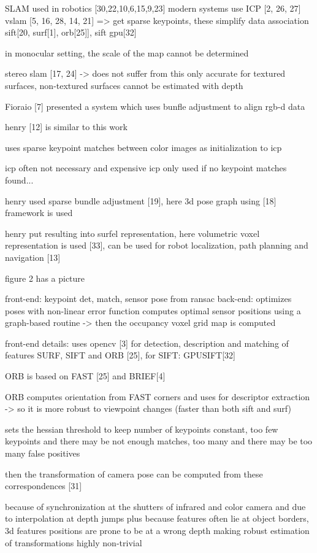 SLAM used in robotics [30,22,10,6,15,9,23]
modern systems use ICP [2, 26, 27]
vslam [5, 16, 28, 14, 21] => get sparse keypoints,  
these simplify data association
sift[20, surf[1], orb[25]], sift gpu[32]


in monocular setting, the scale of the map cannot be  determined

stereo slam [17, 24] -> does not suffer from this
only accurate for textured surfaces, non-textured surfaces cannot be estimated with depth

Fioraio [7] presented a system which uses bunfle adjustment to align rgb-d data

henry [12] is similar to this work

uses sparse keypoint matches between color images as initialization to icp

icp often not necessary and expensive
icp only used if no keypoint matches found...

henry used sparse bundle adjustment [19], here 3d pose graph using [18] framework is used

henry put resulting into surfel representation, here volumetric voxel representation is used [33], can be used for robot localization, path planning and navigation [13]

figure 2 has a picture

front-end: keypoint det, match, sensor pose from ransac
back-end: optimizes poses with non-linear error function
	computes optimal sensor positions using a graph-based routine -> then the occupancy voxel grid map is computed
	
front-end details: 
uses opencv [3] for detection, description and matching of features SURF, SIFT and ORB [25], for SIFT: GPUSIFT[32]

ORB is based on FAST [25] and BRIEF[4]

ORB computes orientation from FAST corners and uses for descriptor extraction -> so it is more robust to viewpoint changes (faster than both sift and surf)

sets the hessian threshold to keep number of keypoints constant, too few keypoints and there may be not enough matches, too many and there may be too many false positives

then the transformation of camera pose can be computed from these correspondences [31]


because of synchronization at the shutters of infrared and color camera and due to interpolation at depth jumps
plus because features often lie at object borders, 3d features positions are prone to be at a wrong depth making robust estimation of transformations highly non-trivial

